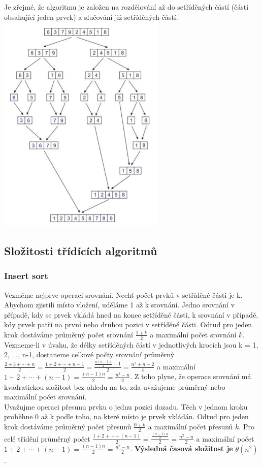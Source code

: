 \documentclass[10pt,a4paper]{article}
\begin{document}
Je zřejmé, že algoritmu je založen na rozdělování až do setříděných částí (částí obsahující jeden prvek) a slučování již setříděných částí. \\
\includegraphics[width=8cm]{img/merge.jpg}





\newpage
\subsection{Složitosti třídících algoritmů}
\subsubsection{Insert sort}
Vezměme nejprve operaci srovnání. Nechť počet prvků v setříděné části je k. Abychom zjistili místo vložení, uděláme 1 až k srovnání. Jedno srovnání v případě, kdy se prvek vkládá hned na konec setříděné části, k srovnání v případě, kdy prvek patří na první nebo druhou pozici v setříděné části. Odtud pro jeden krok dostáváme průměrný počet srovnání $\frac{1+k}{2}$ a maximální počet srovnání $k$. Vezmeme-li v úvahu, že délky setříděných částí v jednotlivých krocích jsou k = 1, 2, ..., n-1, dostaneme celkové počty srovnání průměrný $\frac{2+3+\cdots+n}{2} = \frac{1+2+\cdots+n-1}{2} = \frac{\frac{n(n-1)}{2}-1}{2} = \frac{n^2+n-2}{4}$ a maximální $1+2+\cdots+(n-1) = \frac{(n-1)n}{2} = \frac{n^2-n}{2}$. Z toho plyne, že operace srovnání má kvadratickou složitost bez ohledu na to, zda uvažujeme průměrný nebo maximální počet srovnání. \\
Uvažujme operaci přesunu prvku o jednu pozici dozadu. Těch v jednom kroku proběhne 0 až k podle toho, na které místo je prvek vkládán. Odtud pro jeden krok dostáváme průměrný počet přesunů $\frac{0+k}{2}$ a maximální počet přesunů $k$. Pro celé třídění průměrný počet $\frac{1+2+\cdots+(n-1)}{2} = \frac{\frac{(n-1)n}{2}}{2} = \frac{n^2-n}{2}$ a maximální počet $1+2+\cdots+(n-1) = \frac{(n-1)n}{2} = \frac{n^2-n}{2}$. \textbf{Výsledná časová složitost je} $\theta (n^2)$.
\end{document}

